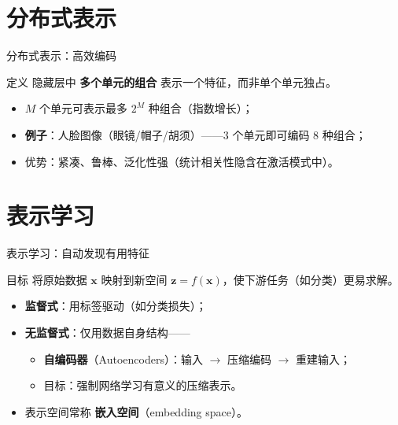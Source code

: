 \documentclass[t,aspectratio=169]{beamer} %
\begin{document}
\section{分布式表示}
\begin{frame}{分布式表示：高效编码}
\begin{block}{定义}
    隐藏层中 {\color{red}\textbf{多个单元的组合}} 表示一个特征，而非单个单元独占。
\end{block}

\begin{itemize}
    \item $M$ 个单元可表示最多 $2^M$ 种组合（指数增长）；
    \item \textbf{例子}：人脸图像（眼镜/帽子/胡须）——3 个单元即可编码 8 种组合；
    \item 优势：紧凑、鲁棒、泛化性强（统计相关性隐含在激活模式中）。
\end{itemize}

\end{frame}

\section{表示学习}
\begin{frame}{表示学习：自动发现有用特征}
\begin{block}{目标}
    将原始数据 $\mathbf{x}$ 映射到新空间 $\mathbf{z} = f(\mathbf{x})$，使下游任务（如分类）更易求解。
\end{block}

\begin{itemize}
    \item \textbf{监督式}：用标签驱动（如分类损失）；
    \item \textbf{无监督式}：仅用数据自身结构——
        \begin{itemize}
            \item {\color{red}\textbf{自编码器}（Autoencoders）}：输入 $\to$ 压缩编码 $\to$ 重建输入；
            \item 目标：强制网络学习有意义的压缩表示。
        \end{itemize}
    \item 表示空间常称 {\color{red}\textbf{嵌入空间}（embedding space）}。
\end{itemize}
\end{frame}
\end{document}

